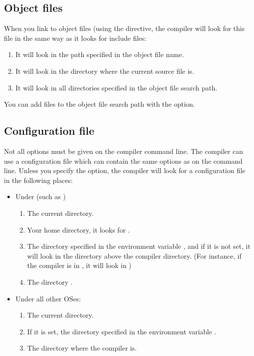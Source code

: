 \subsection{Object files}
When you link to object files (using the  directive,
the compiler will look for this file in the same way as it looks for include
files:

\begin{enumerate}
\item It will look in the path specified in the object file name.
\item It will look in the directory where the current source file is.
\item It will look in all directories specified in the object file search path.
\end{enumerate}
You can add files to the object file search path with the  option.

\subsection{Configuration file}
\label{searchconfig}

Not all options must be given on the compiler command line. The compiler
can use a configuration file which can contain the same options as on the
command line. Unless you specify the  option, the compiler will look
for a configuration file  in the following places:

\begin{itemize}
\item Under \unix (such as \linux)
\begin{enumerate}
\item The current directory.
\item Your home directory, it looks for .
\item The directory specified in the environment 
variable , and if it is not set, it will look in the 
 directory above the compiler directory. (For instance, if the
compiler is in , it will look in )
\item The directory .
\end{enumerate}
\item Under all other OSes:
\begin{enumerate}
\item The current directory.
\item If it is set, the directory specified in the environment variable
.
\item The directory where the compiler is.
\end{enumerate}
\end{itemize}

